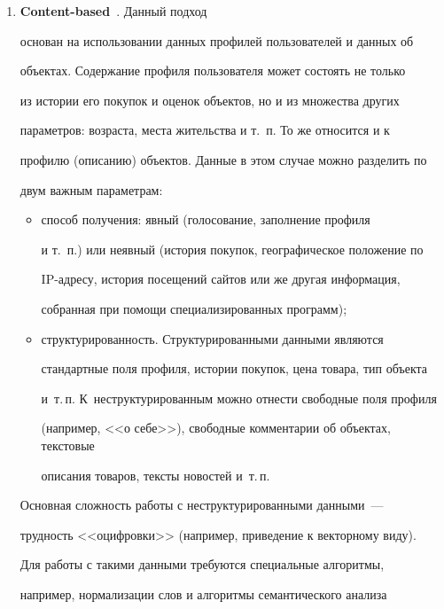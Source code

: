 \begin{enumerate}[1.]
применяемым подходом к построению рекомендательных систем.





\item {\bf Content-based}~\cite{content-based}.  Данный подход


основан на использовании данных профилей пользователей и данных об


объектах. Содержание профиля пользователя может состоять не только


из истории его покупок и оценок объектов, но и из множества других


параметров: возраста, места жительства и т.~п. То же относится и к


профилю (описанию) объектов. Данные в этом случае можно разделить по


двум важным параметрам:


\begin{itemize}


\item[(а)] способ получения: явный (голосование, заполнение профиля


и т.~п.) или неявный (история покупок, географическое положение по


IP-ад\-ре\-су, история посещений сайтов или же другая информация,


собранная при помощи специализированных программ);


\item[(б)] структурированность. Структурированными данными являются


стандартные поля профиля, истории покупок, цена товара, тип объекта


и~т.\,п. К~неструктурированным можно отнести свободные поля профиля


(например, <<о себе>>), свободные комментарии об объектах, текстовые


описания товаров, тексты новостей и~т.\,п.


\end{itemize}





Основная сложность работы с неструктурированными данными~---


трудность <<оцифровки>> (например, приведение к векторному виду).


Для работы с такими данными требуются специальные алгоритмы,


например, нормализации слов и алгоритмы семантического анализа



\end{enumerate}
